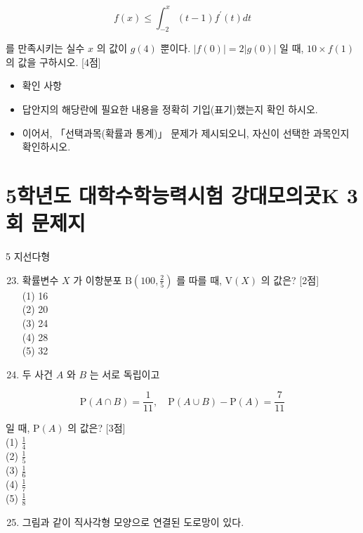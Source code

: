 \documentclass[10pt]{article}
\begin{document}
\[
f(x) \leq \int_{-2}^{x}(t-1) f^{\prime}(t) d t
\]

를 만족시키는 실수 $x$ 의 값이 $g(4)$ 뿐이다. $|f(0)|=2|g(0)|$ 일 때, $10 \times f(1)$ 의 값을 구하시오. [4점]

\begin{itemize}
  \item 확인 사항
\end{itemize}

\begin{itemize}
  \item 답안지의 해당란에 필요한 내용을 정확히 기입(표기)했는지 확인 하시오.

  \item 이어서, 「선택과목(확률과 통계)」 문제가 제시되오니, 자신이 선택한 과목인지 확인하시오.

\end{itemize}

\section*{5학년도 대학수학능력시험 강대모의곳K 3회 문제지}
5 지선다형

\begin{enumerate}
  \setcounter{enumi}{22}
  \item 확률변수 $X$ 가 이항분포 $\mathrm{B}\left(100, \frac{2}{5}\right)$ 를 따를 때, $\mathrm{V}(X)$ 의 값은? [2점]\\
(1) 16\\
(2) 20\\
(3) 24\\
(4) 28\\
(5) 32

  \item 두 사건 $A$ 와 $B$ 는 서로 독립이고

\end{enumerate}

\[
\mathrm{P}(A \cap B)=\frac{1}{11}, \quad \mathrm{P}(A \cup B)-\mathrm{P}(A)=\frac{7}{11}
\]

일 때, $\mathrm{P}(A)$ 의 값은? [3점]\\
(1) $\frac{1}{4}$\\
(2) $\frac{1}{5}$\\
(3) $\frac{1}{6}$\\
(4) $\frac{1}{7}$\\
(5) $\frac{1}{8}$

\begin{enumerate}
  \setcounter{enumi}{24}
  \item 그림과 같이 직사각형 모양으로 연결된 도로망이 있다.
\end{enumerate}
\end{document}
